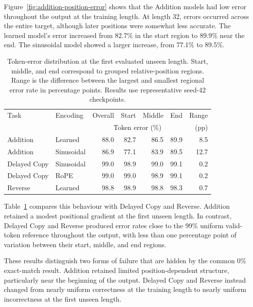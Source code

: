 \documentclass[
    author={Aanchala Ravindra Bhongade},
    supervisor={Dr. Fernando Moreno-Pino},
    degree={MSc},
    title={Length Generalisation in Transformer-Based Sequence Models: Failure Taxonomy and Mitigation Strategies},
    subtitle={},
    type={},
    year={2026}
]{dissertation}
\begin{document}
Figure~\ref{fig:addition-position-error} shows that the Addition models had low error throughout the output at the training length. At length 32, errors occurred across the entire target, although later positions were somewhat less accurate. The learned model's error increased from 82.7\% in the start region to 89.9\% near the end. The sinusoidal model showed a larger increase, from 77.1\% to 89.5\%.

\begin{table}[htbp]
\centering
\scriptsize
\setlength{\tabcolsep}{4pt}
\begin{tabular}{@{}llrrrrr@{}}
\hline
Task & Encoding &
Overall & Start & Middle & End & Range \\
& & \multicolumn{4}{c}{Token error (\%)} & (pp) \\
\hline
Addition & Learned
& 88.0 & 82.7 & 86.5 & 89.9 & 8.5 \\
Addition & Sinusoidal
& 86.9 & 77.1 & 83.9 & 89.5 & 12.7 \\
Delayed Copy & Sinusoidal
& 99.0 & 98.9 & 99.0 & 99.1 & 0.2 \\
Delayed Copy & RoPE
& 99.0 & 99.0 & 98.9 & 99.1 & 0.2 \\
Reverse & Learned
& 98.8 & 98.9 & 98.8 & 98.3 & 0.7 \\
\hline
\end{tabular}
\caption{Token-error distribution at the first evaluated unseen length. Start, middle, and end correspond to grouped relative-position regions. Range is the difference between the largest and smallest regional error rate in percentage points. Results use representative seed-42 checkpoints.}
\label{tab:position-error-summary}
\end{table}

Table~\ref{tab:position-error-summary} compares this behaviour with Delayed Copy and Reverse. Addition retained a modest positional gradient at the first unseen length. In contrast, Delayed Copy and Reverse produced error rates close to the 99\% uniform valid-token reference throughout the output, with less than one percentage point of variation between their start, middle, and
end regions.

These results distinguish two forms of failure that are hidden by the common 0\% exact-match result. Addition retained limited position-dependent structure, particularly near the beginning of the output. Delayed Copy and Reverse instead changed from nearly uniform correctness at the training length to nearly uniform incorrectness at the first unseen length.
\end{document}
